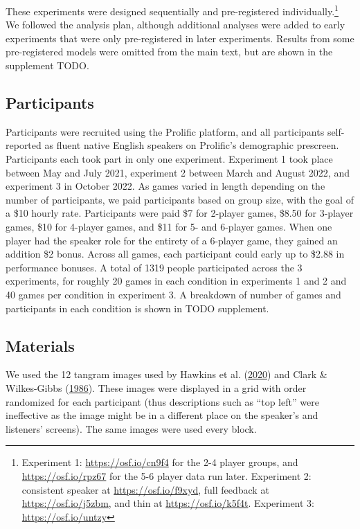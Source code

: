 \documentclass[
  english,
  a4paper,
]{article}
\begin{document}
These experiments were designed sequentially and pre-registered individually.\footnote{Experiment 1: \url{https://osf.io/cn9f4} for the 2-4 player groups, and \url{https://osf.io/rpz67} for the 5-6 player data run later. Experiment 2: consistent speaker at \url{https://osf.io/f9xyd}, full feedback at \url{https://osf.io/j5zbm}, and thin at \url{https://osf.io/k5f4t}. Experiment 3: \url{https://osf.io/untzy}} We followed the analysis plan, although additional analyses were added to early experiments that were only pre-registered in later experiments. Results from some pre-registered models were omitted from the main text, but are shown in the supplement TODO.

\hypertarget{participants}{%
\subsection{Participants}\label{participants}}

Participants were recruited using the Prolific platform, and all participants self-reported as fluent native English speakers on Prolific's demographic prescreen. Participants each took part in only one experiment. Experiment 1 took place between May and July 2021, experiment 2 between March and August 2022, and experiment 3 in October 2022. As games varied in length depending on the number of participants, we paid participants based on group size, with the goal of a \$10 hourly rate. Participants were paid \$7 for 2-player games, \$8.50 for 3-player games, \$10 for 4-player games, and \$11 for 5- and 6-player games. When one player had the speaker role for the entirety of a 6-player game, they gained an addition \$2 bonus. Across all games, each participant could early up to \$2.88 in performance bonuses. A total of 1319 people participated across the 3 experiments, for roughly 20 games in each condition in experiments 1 and 2 and 40 games per condition in experiment 3. A breakdown of number of games and participants in each condition is shown in TODO supplement.

\hypertarget{materials}{%
\subsection{Materials}\label{materials}}

We used the 12 tangram images used by Hawkins et al. (\protect\hyperlink{ref-hawkinsCharacterizingDynamicsLearning2020}{2020}) and Clark \& Wilkes-Gibbs (\protect\hyperlink{ref-clarkReferringCollaborativeProcess1986}{1986}). These images were displayed in a grid with order randomized for each participant (thus descriptions such as ``top left'' were ineffective as the image might be in a different place on the speaker's and listeners' screens). The same images were used every block.
\end{document}
